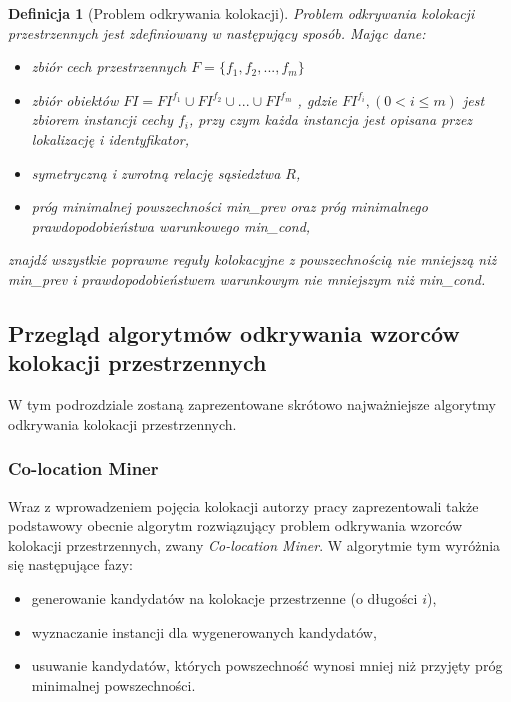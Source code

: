 \documentclass[12pt]{article}
\newtheorem{defin}{Definicja}
\begin{document}
\begin{defin}[Problem odkrywania kolokacji]
Problem odkrywania kolokacji przestrzennych jest zdefiniowany w następujący sposób.
Mając dane:
\begin{itemize}
\item zbiór cech przestrzennych $F = \{ f_{1}, f_{2}, ...,f_{m} \} $
\item zbiór obiektów $FI = FI^{f_{1}} \cup FI^{f_{2}} \cup ... \cup FI^{f_{m}}$  , gdzie $ FI^{f_{i}},(0 < i \le m) $ jest zbiorem instancji cechy $ f_{i}$, przy czym każda instancja jest opisana przez lokalizację i identyfikator,
\item symetryczną i zwrotną relację sąsiedztwa $R$,
\item próg minimalnej powszechności min\_prev oraz próg minimalnego prawdopodobieństwa warunkowego min\_cond,
\end{itemize}
znajdź wszystkie poprawne reguły kolokacyjne z powszechnością nie mniejszą niż min\_prev i prawdopodobieństwem warunkowym nie mniejszym niż min\_cond.
\end{defin}

\subsection{Przegląd algorytmów odkrywania wzorców kolokacji przestrzennych}

W tym podrozdziale zostaną zaprezentowane skrótowo najważniejsze algorytmy odkrywania kolokacji przestrzennych. 

\subsubsection{Co-location Miner}

Wraz z wprowadzeniem pojęcia kolokacji autorzy pracy \cite{huang} zaprezentowali także podstawowy obecnie algorytm rozwiązujący problem odkrywania wzorców kolokacji przestrzennych, zwany \textit{Co-location Miner}. W algorytmie tym wyróżnia się następujące fazy:

\begin{itemize}
\item generowanie kandydatów na kolokacje przestrzenne (o długości $i$),
\item wyznaczanie instancji dla wygenerowanych kandydatów,
\item usuwanie kandydatów, których powszechność wynosi mniej niż przyjęty próg minimalnej powszechności.
\end{itemize}
\end{document}
